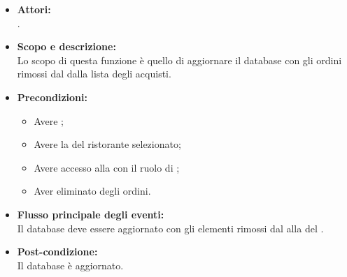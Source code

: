 \begin{itemize}
	\item \textbf{Attori:}
	\\.
	\item \textbf{Scopo e descrizione:} 
	\\Lo scopo di questa funzione è quello di aggiornare il database con gli ordini rimossi dal  dalla lista degli acquisti.
	\item \textbf{Precondizioni:}
	\begin{itemize}
		\item Avere ;
		\item Avere la  del ristorante selezionato;
		\item Avere accesso alla  con il ruolo di ;
		\item Aver eliminato degli ordini.
	\end{itemize}
	\item \textbf{Flusso principale degli eventi:}
	\\Il database deve essere aggiornato con gli elementi rimossi dal  alla  del .
	\item \textbf{Post-condizione:}
	\\Il database è aggiornato.
\end{itemize}
